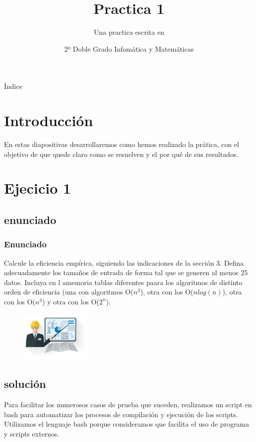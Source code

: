 \documentclass[compress]{beamer}
\title{Practica 1}                                               %
\subtitle{Una practica escrita en \beamer}                                  %
\date{2º Doble Grado Infomática y Matemáticas}                                                            %
\begin{document}
\begin{frame}
\titlepage
\end{frame}

\begin{frame}{Índice}
  \hypertarget{index}{}
  \tableofcontents
  
\end{frame}
\section{Introducción}
\begin{frame}
En estas diapositivas desarrollaremos como hemos realizado la prática, con el objetivo de que quede claro como se resuelven y el por qué de sus resultados.
\end{frame}

\section{Ejecicio 1}
\subsection{enunciado}
\begin{frame}

\frametitle{Enunciado}
	Calcule  la eficiencia empírica, siguiendo las indicaciones de la sección 3. Defina adecuadamente los tamaños de entrada de forma tal que se generen al menos 25 datos. Incluya en l amemoria tablas diferentes paara los algoritmos de distinto orden de eficiencia (una con algoritmos O($n^2$), otra con los O($nlog(n)$), otra con los O($n^3$) y otra con los O($2^n$).
	\begin{figure}
  \centering
    \includegraphics[width=0.3\textwidth]{eficiencia.png}
  \label{fig:ejemplo}
\end{figure}
\end{frame}


\subsection{solución}
\begin{frame}
Para facilitar los numerosos casos de prueba que suceden, realizamos un script en bash para automatizar los procesos de compilación y ejecución de los scripts. Utilizamos el lenguaje bash porque consideramos que facilita el uso de programa y scripts externos.
\end{frame}
\end{document}
